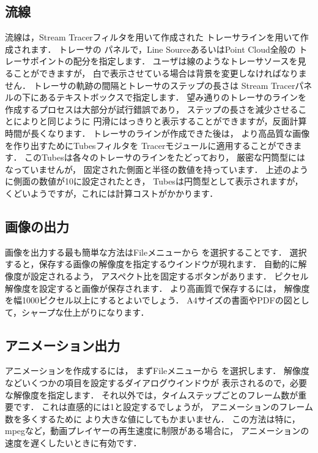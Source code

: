 \subsection{流線}
\label{ssec:6.1.8}
流線は，Stream Tracerフィルタを用いて作成された
トレーサラインを用いて作成されます．
トレーサの
%
%
パネルで，Line SourceあるいはPoint Cloud全般の
トレーサポイントの配分を指定します．
ユーザは線のようなトレーサソースを見ることができますが，
白で表示させている場合は背景を変更しなければなりません．
トレーサの軌跡の間隔とトレーサのステップの長さは
Stream Tracerパネルの下にあるテキストボックスで指定します．
望み通りのトレーサのラインを作成するプロセスは大部分が試行錯誤であり，
ステップの長さを減少させることによりと同じように
円滑にはっきりと表示することができますが，反面計算時間が長くなります．
トレーサのラインが作成できた後は，
より高品質な画像を作り出すためにTubesフィルタを
Tracerモジュールに適用することができます．
このTubesは各々のトレーサのラインをたどっており，
厳密な円筒型にはなっていませんが，
固定された側面と半径の数値を持っています．
上述のように側面の数値が10に設定されたとき，
Tubesは円筒型として表示されますが，
くどいようですが，これには計算コストがかかります．


\subsection{画像の出力}
\label{ssec:6.1.9}
画像を出力する最も簡単な方法はFileメニューから
%
%
を選択することです．
選択すると，保存する画像の解像度を指定するウインドウが現れます．
自動的に解像度が設定されるよう，
アスペクト比を固定するボタンがあります．
ピクセル解像度を設定すると画像が保存されます．
より高画質で保存するには，
解像度を幅1000ピクセル以上にするとよいでしょう．
A4サイズの書面やPDFの図として，シャープな仕上がりになります．


\subsection{アニメーション出力}
\label{ssec:6.1.10}
アニメーションを作成するには，
まずFileメニューから
%
%
を選択します．
解像度などいくつかの項目を設定するダイアログウインドウが
表示されるので，必要な解像度を指定します．
それ以外では，タイムステップごとのフレーム数が重要です．
これは直感的には1と設定するでしょうが，
アニメーションのフレーム数を多くするために
より大きな値にしてもかまいません．
この方法は特に，mpegなど，動画プレイヤーの再生速度に制限がある場合に，
アニメーションの速度を遅くしたいときに有効です．

